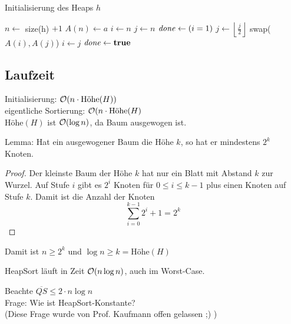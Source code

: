         \begin{algorithm}[htp]
            \caption{Initialisierung des Heaps $h$}
            \label{alg:init-heap}
            \begin{algorithmic}
                    \State {}
                \EndFor

                    \State $n \gets $ size(h) $ + 1$
                    \State $A(n) \gets a$
                    \State $i \gets n$
                    \State $j \gets n$
                    \State $\text{\emph{done}} \gets (i = 1)$
                        \State $j \gets \left\lfloor\frac{j}{2}\right\rfloor$
                            \State swap($A(i), A(j)$)
                            \State $i \gets j$
                        \Else
                            \State $\text{\emph{done}} \gets \text{\textbf{true}}$
                        \EndIf
                    \EndWhile
                \EndFunction
            \end{algorithmic}
        \end{algorithm}

        \subsection{Laufzeit}
        Initialisierung: $\mathcal{O}(n \cdot \text{Höhe}(H))$ \\
        eigentliche Sortierung: $\mathcal{O}(n \cdot \text{Höhe}(H)$ \\
        Höhe$(H)$ ist $\mathcal{O}(\log n)$, da Baum ausgewogen ist. \\
        \begin{satz}    
            Lemma: Hat ein ausgewogener Baum die Höhe $k$, so hat er mindestens $2^k$ Knoten.
        \end{satz}
        \begin{proof}
            Der kleinste Baum der Höhe $k$ hat nur ein Blatt mit Abstand $k$ zur Wurzel. Auf Stufe $i$ gibt es $2^i$ Knoten für $0 \leq i \leq k-1$ plus einen Knoten auf Stufe $k$. Damit ist die Anzahl der Knoten
            $$
                \sum^{k-1}_{i=0}{2^i} + 1 = 2^k
            $$
        \end{proof}        
        Damit ist $n \geq 2^k$ und $\log n \geq k = \text{Höhe}(H)$
        \begin{satz}
            HeapSort läuft in Zeit $\mathcal{O}(n \log n)$, auch im Worst-Case. \\
        \end{satz}
        Beachte $\overline{QS} \leq 2 \cdot n \log n$ \\
        Frage: Wie ist HeapSort-Konstante? \\
        (Diese Frage wurde von Prof. Kaufmann offen gelassen ;) )

